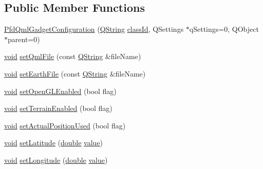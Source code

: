 \subsection*{Public Member Functions}
\begin{DoxyCompactItemize}
\item 
\hyperlink{class_pfd_qml_gadget_configuration_a54f1c01beaedf27b9942cfef21e02c68}{Pfd\-Qml\-Gadget\-Configuration} (\hyperlink{group___u_a_v_objects_plugin_gab9d252f49c333c94a72f97ce3105a32d}{Q\-String} \hyperlink{group___core_plugin_gac953657221ba7fda967ada0408332641}{class\-Id}, Q\-Settings $\ast$q\-Settings=0, Q\-Object $\ast$parent=0)
\item 
\hyperlink{group___u_a_v_objects_plugin_ga444cf2ff3f0ecbe028adce838d373f5c}{void} \hyperlink{class_pfd_qml_gadget_configuration_add530fb1fb1a12917018e7dc239e2635}{set\-Qml\-File} (const \hyperlink{group___u_a_v_objects_plugin_gab9d252f49c333c94a72f97ce3105a32d}{Q\-String} \&file\-Name)
\item 
\hyperlink{group___u_a_v_objects_plugin_ga444cf2ff3f0ecbe028adce838d373f5c}{void} \hyperlink{class_pfd_qml_gadget_configuration_aeaec2eb0b59f88ca387f4c8f05aab1a1}{set\-Earth\-File} (const \hyperlink{group___u_a_v_objects_plugin_gab9d252f49c333c94a72f97ce3105a32d}{Q\-String} \&file\-Name)
\item 
\hyperlink{group___u_a_v_objects_plugin_ga444cf2ff3f0ecbe028adce838d373f5c}{void} \hyperlink{class_pfd_qml_gadget_configuration_a86d2f75f19af4da9db4702f5760b44fe}{set\-Open\-G\-L\-Enabled} (bool flag)
\item 
\hyperlink{group___u_a_v_objects_plugin_ga444cf2ff3f0ecbe028adce838d373f5c}{void} \hyperlink{class_pfd_qml_gadget_configuration_a0e2cd3589d30a04b4db4a948a56cfe7f}{set\-Terrain\-Enabled} (bool flag)
\item 
\hyperlink{group___u_a_v_objects_plugin_ga444cf2ff3f0ecbe028adce838d373f5c}{void} \hyperlink{class_pfd_qml_gadget_configuration_ac5751a8cd63d1fa62461dcc139ab950c}{set\-Actual\-Position\-Used} (bool flag)
\item 
\hyperlink{group___u_a_v_objects_plugin_ga444cf2ff3f0ecbe028adce838d373f5c}{void} \hyperlink{class_pfd_qml_gadget_configuration_a5dfda99122f3f1e7d2e8144f95f2c08a}{set\-Latitude} (\hyperlink{_super_l_u_support_8h_a8956b2b9f49bf918deed98379d159ca7}{double} \hyperlink{glext_8h_aa0e2e9cea7f208d28acda0480144beb0}{value})
\item 
\hyperlink{group___u_a_v_objects_plugin_ga444cf2ff3f0ecbe028adce838d373f5c}{void} \hyperlink{class_pfd_qml_gadget_configuration_a61c40ee7891fdc413f2e65d35f45075e}{set\-Longitude} (\hyperlink{_super_l_u_support_8h_a8956b2b9f49bf918deed98379d159ca7}{double} \hyperlink{glext_8h_aa0e2e9cea7f208d28acda0480144beb0}{value})

\end{DoxyCompactItemize}
